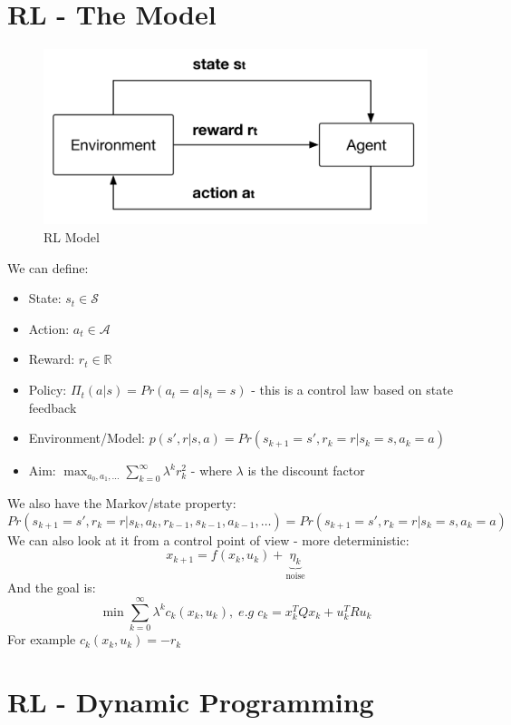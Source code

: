 \documentclass{article}
\begin{document}
\section{RL - The Model}
\begin{figure}[H]
    \centering
    \includegraphics[width=0.4\linewidth]{Screenshot 2023-03-03 at 12.15.53.png}
    \caption{RL Model}
\end{figure}
We can define:
\begin{itemize}
    \item State: $s_t \in \mathcal{S}$
    \item Action: $a_t \in \mathcal{A}$
    \item Reward: $r_t \in \mathbb{R}$
    \item Policy: $\Pi_t(a|s) = Pr(a_t = a | s_t = s)$ - this is a control law based on state feedback
    \item Environment/Model: $p(s',r|s,a) = Pr(s_{k+1} = s', r_k = r| s_k = s, a_k = a)$
    \item Aim: $\max_{a_0,a_1,\hdots} \sum_{k=0}^\infty \lambda^k r_k^2 $ - where $\lambda$ is the discount factor
\end{itemize}
We also have the Markov/state property:
\[
Pr(s_{k+1} = s', r_k = r|s_k,a_k,r_{k-1},s_{k-1},a_{k-1},\hdots) = Pr(s_{k+1} = s', r_k = r| s_k = s, a_k = a)
\]
We can also look at it from a control point of view - more deterministic:
\[
x_{k+1} = f(x_k,u_k) + \underbrace{\eta_k}_{\text{noise}}
\]
And the goal is:
\[
\min \sum_{k=0}^\infty \lambda^k c_k(x_k,u_k), \; e.g \; c_k = x_k^TQx_k + u_k^T R u_k
\]
For example $c_k(x_k,u_k) = -r_k$
\section{RL - Dynamic Programming}
\end{document}
